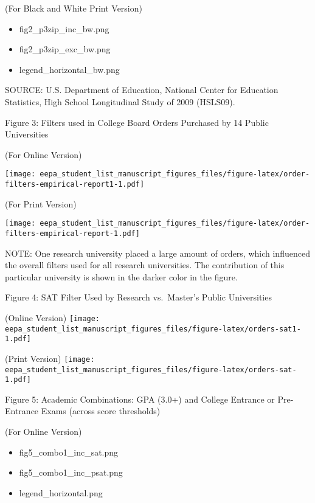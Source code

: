 \documentclass[
  12pt,
]{article}
\providecommand{\tightlist}{%
  \setlength{\itemsep}{0pt}\setlength{\parskip}{0pt}}
\begin{document}
(For Black and White Print Version)

\begin{itemize}
\tightlist
\item
  fig2\_p3zip\_inc\_bw.png
\item
  fig2\_p3zip\_exc\_bw.png
\item
  legend\_horizontal\_bw.png
\end{itemize}

SOURCE: U.S. Department of Education, National Center for Education Statistics, High School Longitudinal Study of 2009 (HSLS09).

\pagebreak

Figure 3: Filters used in College Board Orders Purchased by 14 Public Universities \newline 

(For Online Version) \newline

\texttt{[image: eepa\_student\_list\_manuscript\_figures\_files/figure-latex/order-filters-empirical-report1-1.pdf]}

\pagebreak

(For Print Version) \newline

\texttt{[image: eepa\_student\_list\_manuscript\_figures\_files/figure-latex/order-filters-empirical-report-1.pdf]}

NOTE: One research university placed a large amount of orders, which influenced the overall filters used for all research universities. The contribution of this particular university is shown in the darker color in the figure.

\pagebreak

Figure 4: SAT Filter Used by Research vs.~Master's Public Universities \newline

(Online Version) \newline
\texttt{[image: eepa\_student\_list\_manuscript\_figures\_files/figure-latex/orders-sat1-1.pdf]}

(Print Version) \newline
\texttt{[image: eepa\_student\_list\_manuscript\_figures\_files/figure-latex/orders-sat-1.pdf]}

\pagebreak

Figure 5: Academic Combinations: GPA (3.0+) and College Entrance or Pre-Entrance Exams (across score thresholds)

(For Online Version)

\begin{itemize}
\tightlist
\item
  fig5\_combo1\_inc\_sat.png
\item
  fig5\_combo1\_inc\_psat.png
\item
  legend\_horizontal.png
\end{itemize}
\end{document}
